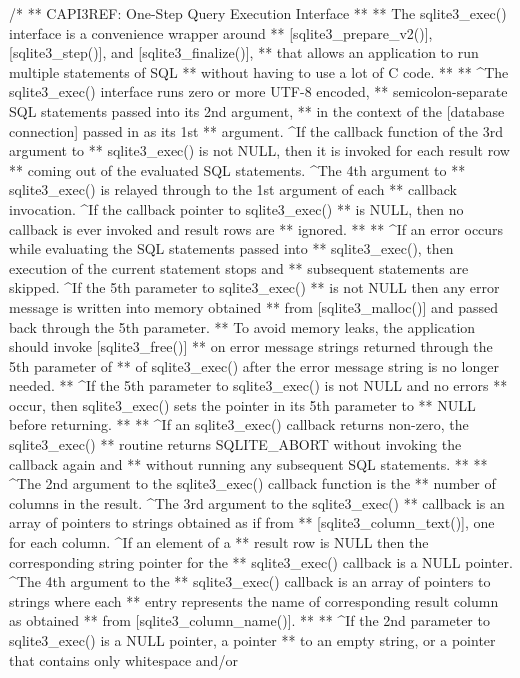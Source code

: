 \begin{Codex}[label=sqlite3.h,numbers=left]
{/*
** CAPI3REF: One-Step Query Execution Interface
**
** The sqlite3_exec() interface is a convenience wrapper around
** [sqlite3_prepare_v2()], [sqlite3_step()], and [sqlite3_finalize()],
** that allows an application to run multiple statements of SQL
** without having to use a lot of C code. 
**
** ^The sqlite3_exec() interface runs zero or more UTF-8 encoded,
** semicolon-separate SQL statements passed into its 2nd argument,
** in the context of the [database connection] passed in as its 1st
** argument.  ^If the callback function of the 3rd argument to
** sqlite3_exec() is not NULL, then it is invoked for each result row
** coming out of the evaluated SQL statements.  ^The 4th argument to
** sqlite3_exec() is relayed through to the 1st argument of each
** callback invocation.  ^If the callback pointer to sqlite3_exec()
** is NULL, then no callback is ever invoked and result rows are
** ignored.
**
** ^If an error occurs while evaluating the SQL statements passed into
** sqlite3_exec(), then execution of the current statement stops and
** subsequent statements are skipped.  ^If the 5th parameter to sqlite3_exec()
** is not NULL then any error message is written into memory obtained
** from [sqlite3_malloc()] and passed back through the 5th parameter.
** To avoid memory leaks, the application should invoke [sqlite3_free()]
** on error message strings returned through the 5th parameter of
** of sqlite3_exec() after the error message string is no longer needed.
** ^If the 5th parameter to sqlite3_exec() is not NULL and no errors
** occur, then sqlite3_exec() sets the pointer in its 5th parameter to
** NULL before returning.
**
** ^If an sqlite3_exec() callback returns non-zero, the sqlite3_exec()
** routine returns SQLITE_ABORT without invoking the callback again and
** without running any subsequent SQL statements.
**
** ^The 2nd argument to the sqlite3_exec() callback function is the
** number of columns in the result.  ^The 3rd argument to the sqlite3_exec()
** callback is an array of pointers to strings obtained as if from
** [sqlite3_column_text()], one for each column.  ^If an element of a
** result row is NULL then the corresponding string pointer for the
** sqlite3_exec() callback is a NULL pointer.  ^The 4th argument to the
** sqlite3_exec() callback is an array of pointers to strings where each
** entry represents the name of corresponding result column as obtained
** from [sqlite3_column_name()].
**
** ^If the 2nd parameter to sqlite3_exec() is a NULL pointer, a pointer
** to an empty string, or a pointer that contains only whitespace and/or 
}
\end{Codex}
